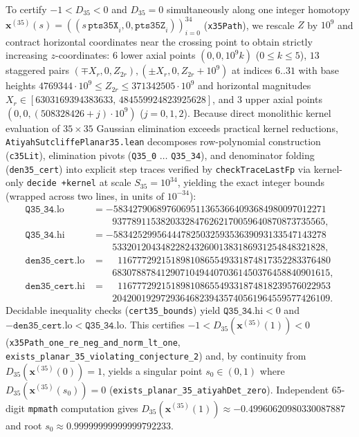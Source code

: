 \documentclass[11pt,reqno]{amsart}
\theoremstyle{remark}
\begin{document}
To certify $-1 < D_{35} < 0$ and $D_{35} = 0$ simultaneously along one integer homotopy $\mathbf{x}^{(35)}(s) = ((s\,\texttt{pts35X}_i, 0, \texttt{pts35Z}_i))_{i=0}^{34}$ (\texttt{x35Path}), we rescale $Z$ by $10^9$ and contract horizontal coordinates near the crossing point to obtain strictly increasing $z$-coordinates: $6$ lower axial points $(0,0,10^9 k)$ ($0 \le k \le 5$), $13$ staggered pairs $(\mp X_r, 0, Z_{2r}), (\pm X_r, 0, Z_{2r}+10^9)$ at indices $6..31$ with base heights $4769344 \cdot 10^9 \le Z_{2r} \le 371342505 \cdot 10^9$ and horizontal magnitudes $X_r \in [6303169394383633,\, 484559924823925628]$, and $3$ upper axial points $(0,0, (508328426 + j) \cdot 10^9)$ ($j = 0, 1, 2$).
Because direct monolithic kernel evaluation of $35 \times 35$ Gaussian elimination exceeds practical kernel reductions, \texttt{AtiyahSutcliffePlanar35.lean} decomposes row-polynomial construction (\texttt{c35Lit}), elimination pivots (\texttt{Q35\_0} $\dots$ \texttt{Q35\_34}), and denominator folding (\texttt{den35\_cert}) into explicit step traces verified by \texttt{checkTraceLastFp} via kernel-only \texttt{decide +kernel} at scale $S_{35} = 10^{34}$, yielding the exact integer bounds (wrapped across two lines, in units of $10^{-34}$):
{\scriptsize
\begin{align*}
  \texttt{Q35\_34}.\mathrm{lo} &= -58342790689760695113653664093684980097012271 \\
    &\qquad 93778911538203328476262170059640870873735565, \\
  \texttt{Q35\_34}.\mathrm{hi} &= -58342529956444782503259353639093133547143278 \\
    &\qquad 53320120434822824326001383186931254848321828, \\
  \texttt{den35\_cert}.\mathrm{lo} &= \phantom{-}11677729215189810865549331874817352283376480 \\
    &\qquad 683078878412907104944070361450376458840901615, \\
  \texttt{den35\_cert}.\mathrm{hi} &= \phantom{-}11677729215189810865549331874818239576022953 \\
    &\qquad 204200192972936468239435740561964559577426109.
\end{align*}
}%
Decidable inequality checks (\texttt{cert35\_bounds}) yield $\texttt{Q35\_34}.\mathrm{hi} < 0$ and $-\texttt{den35\_cert}.\mathrm{lo} < \texttt{Q35\_34}.\mathrm{lo}$.
This certifies $-1 < D_{35}(\mathbf{x}^{(35)}(1)) < 0$ (\texttt{x35Path\_one\_re\_neg\_and\_norm\_lt\_one}, \texttt{exists\_planar\_35\_violating\_conjecture\_2}) and, by continuity from $D_{35}(\mathbf{x}^{(35)}(0)) = 1$, yields a singular point $s_0 \in (0, 1)$ where $D_{35}(\mathbf{x}^{(35)}(s_0)) = 0$ (\texttt{exists\_planar\_35\_atiyahDet\_zero}).
Independent $65$-digit \texttt{mpmath} computation gives $D_{35}(\mathbf{x}^{(35)}(1)) \approx -0.49960620980330087887$ and root $s_0 \approx 0.99999999999999792233$.
\end{document}
